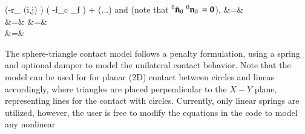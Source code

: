     \left(-r_ {(i,j)} \cdot {} \right) \left( -f_c \cdot \delta_f  \right) +  (...)
\eea
and (note that $\prescript{0}{}{\tilde {\mathbf{n}}_0}\, \prescript{0}{}{\mathbf{n}_0}\, = \mathbf{0}$),
\bea
   &=& \nonumber\\
   &=&
\eea
\bea
   &=& \nonumber\\
   &=&
\eea







%
%
The sphere-triangle contact model follows a penalty formulation, using a spring and optional damper to model the unilateral contact behavior. Note that the model can be used for for planar (2D) contact between circles and lineas accordingly, where triangles are placed perpendicular to the $X-Y$ plane, representing lines for the contact with circles.
Currently, only linear springs are utilized, however, the user is free to modify the equations in the code to model any nonlinear 

